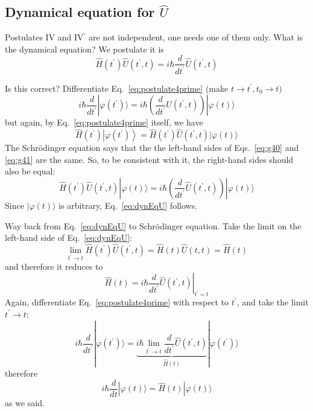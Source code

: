 \documentclass[12pt]{article}
\begin{document}
\subsection{\texorpdfstring{Dynamical equation for $\hat{U}$}{Dynamical equation for U}}

Postulates IV and IV$^\prime$ are not independent, one needs
one of them only. What is the dynamical equation?
We postulate it is
\begin{equation}
\boxed{
\hat{H}\left(t^{\prime}\right) \hat{U}\left(t^{\prime}, t\right)=i \hbar \frac{d}{d t^{\prime}} \hat{U}\left(t^{\prime}, t\right)
}
\label{eq:dynEqU}
\end{equation}

Is this correct? Differentiate Eq.~\eqref{eq:postulate4prime} (make $t \to t^\prime, t_0\to t)$
\begin{equation}
i \hbar \frac{d}{d t^\prime}|\varphi(t^\prime)\rangle =
i \hbar\left(\frac{d}{d t^\prime} \hat{U}\left(t^{\prime},t\right) \right) |\varphi(t)\rangle	
\label{eq:g40}
\end{equation}
but again, by Eq.~\eqref{eq:postulate4prime} itself, we have
\begin{equation}
\hat{H}\left(t^{\prime}\right)\left|\varphi\left(t^{\prime}\right)\right\rangle=
\hat{H}(t^\prime) \hat{U}\left(t^{\prime}, t\right)|\varphi(t)\rangle
\label{eq:g41}
\end{equation}
The Schrödinger equation says that the the left-hand sides of Eqs.~\ref{eq:g40} and \ref{eq:g41} are the same.
So, to be consistent with it, the right-hand sides should also be equal:
\[
\hat{H}(t^\prime) \hat{U}\left(t^{\prime}, t\right)|\varphi(t)\rangle = 
i \hbar\left(\frac{d}{d t^\prime} \hat{U}\left(t^{\prime},t\right) \right) |\varphi(t)\rangle
\]
Since $|\varphi(t)\rangle$ is arbitrary, Eq.~\eqref{eq:dynEqU} follows.


Way back from Eq.~\eqref{eq:dynEqU} to Schrödinger equation. Take the limit on the left-hand side of Eq.~\eqref{eq:dynEqU}:
\[
\lim _{t^{\prime} \rightarrow t} 
\hat{H} (t^{\prime}) \hat{U}(t^{\prime}, t)=\hat{H}(t) \hat{U}(t, t)=\hat{H}(t)
\]
and therefore it reduces to
\begin{equation}
\hat{H}(t)=\left.i \hbar \frac{d}{d t^{\prime}} \hat{U}\left(t^{\prime}, t\right)\right|_{t^{\prime}=t}
\label{eq:g42}
\end{equation}
Again, differentiate Eq.~\eqref{eq:postulate4prime} with respect to $t^\prime$, and take the limit $t^\prime \to t$:
\begin{equation}
i \hbar \frac{d}{d t^\prime}|\varphi(t^\prime)\rangle = 
\underbrace{i \hbar \lim _{t^{\prime} \rightarrow t} \frac{d}{d t^{\prime}} \hat{U}\left(t^{\prime}, t\right)}%
_{\hat{H}(t)}%
|\varphi(t^\prime)\rangle
\end{equation}
therefore
\[
i \hbar \frac{d}{d t}|\varphi(t)\rangle=\hat{H}(t)|\varphi(t)\rangle
\]
as we said.
\end{document}
